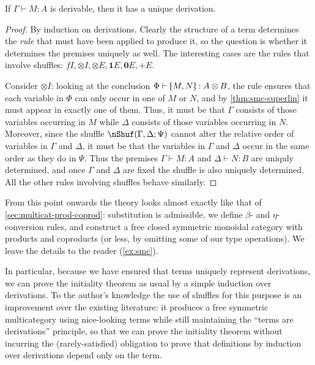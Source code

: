 \documentclass{book}
\let\types\vdash
\def\plusE{\mathord{+}E}
\def\zero{\mathbf{0}}
\def\one{\mathbf{1}}
\let\tensor\otimes
\def\tensorI{\mathord{\tensor}I}
\def\tensorE{\mathord{\tensor}E}
\def\tpair#1#2{\text{\textlquill} #1,#2 \text{\textrquill}}%
\begin{document}
\begin{lem}\label{thm:smc-tad}
  If $\Gamma\types M:A$ is derivable, then it has a unique derivation.
\end{lem}
\begin{proof}
  By induction on derivations.
  Clearly the structure of a term determines the \emph{rule} that must have been applied to produce it, so the question is whether it determines the premises uniquely as well.
  The interesting cases are the rules that involve shuffles: $fI,\tensorI,\tensorE,\one E,\zero E,\plusE$.

  Consider $\tensorI$: looking at the conclusion $\Phi \types \tpair M N : A \tensor B$, the rule ensures that each variable in $\Phi$ can only occur in one of $M$ or $N$, and by \cref{thm:smc-superlin} it must appear in exactly one of them.
  Thus, it must be that $\Gamma$ consists of those variables occurring in $M$ while $\Delta$ consists of those variables occurring in $N$.
  Moreover, since the shuffle $\nShuf(\Gamma,\Delta;\Psi)$ cannot alter the relative order of variables in $\Gamma$ and $\Delta$, it must be that the variables in $\Gamma$ and $\Delta$ occur in the same order as they do in $\Psi$.
  Thus the premises $\Gamma\types M:A$ and $\Delta\types N:B$ are uniquly determined, and once $\Gamma$ and $\Delta$ are fixed the shuffle is also uniquely determined.
  All the other rules involving shuffles behave similarly.
\end{proof}

From this point onwards the theory looks almost exactly like that of \cref{sec:multicat-prod-coprod}: substitution is admissible, we define $\beta$- and $\eta$-conversion rules, and construct a free closed symmetric monoidal category with products and coproducts (or less, by omitting some of our type operations).
We leave the details to the reader (\cref{ex:smc}).

In particular, because we have ensured that terms uniquely represent derivations, we can prove the initiality theorem as usual by a simple induction over derivations.
To the author's knowledge the use of shuffles for this purpose is an improvement over the existing literature: it produces a free symmetric multicategory using nice-looking terms while still maintaining the ``terms are derivations'' principle, so that we can prove the initiality theorem without incurring the (rarely-satisfied) obligation to prove that definitions by induction over derivations depend only on the term.
\end{document}
